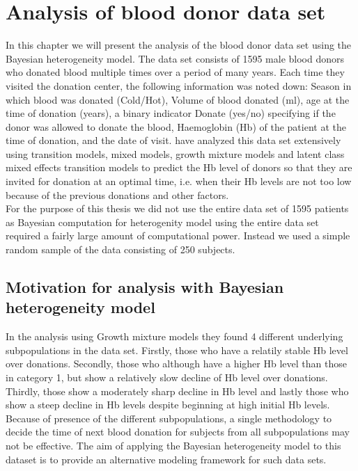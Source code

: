 
\chapter{Analysis of blood donor data set}
\label{ch : blood_donor}
 
 In this chapter we will present the analysis of the blood donor data set \citep{nasserinejad_prevalence_2015} using the Bayesian heterogeneity model. The data set consists of 1595 male blood donors who donated blood multiple times over a period of many years. Each time they visited the donation center, the following information was noted down: Season in which blood was donated (Cold/Hot), Volume of blood donated (ml), age at the time of donation (years), a binary indicator Donate (yes/no) specifying if the donor was allowed to donate the blood, Haemoglobin (Hb) of the patient at the time of donation, and the date of visit. \citet{nasserinejad_predicting_2013,nasserinejad_prevalence_2015,nasserinejad_prediction_2016} have analyzed this data set extensively using transition models, mixed models, growth mixture models and latent class mixed effects transition models to predict the Hb level of donors so that they are invited for donation at an optimal time, i.e. when their Hb levels are not too low because of the previous donations and other factors.\\

 For the purpose of this thesis we did not use the entire data set of 1595 patients as Bayesian computation for heterogenity model using the entire data set required a fairly large amount of computational power. Instead we used a simple random sample of the data consisting of 250 subjects.

\section{Motivation for analysis with Bayesian heterogeneity model}
 In the analysis using Growth mixture models they found 4 different underlying subpopulations in the data set. Firstly, those who have a relatily stable Hb level over donations. Secondly, those who although have a higher Hb level than those in category 1, but show a relatively slow decline of Hb level over donations. Thirdly, those show a moderately sharp decline in Hb level and lastly those who show a steep decline in Hb levels despite beginning at high initial Hb levels. Because of presence of the different subpopulations, a single methodology to decide the time of next blood donation for subjects from all subpopulations may not be effective. The aim of applying the Bayesian heterogeneity model to this dataset is to provide an alternative modeling framework for such data sets.

